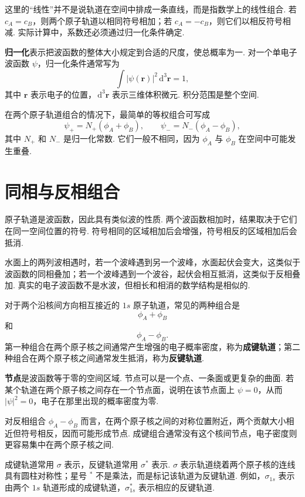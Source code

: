 \documentclass[UTF8,11pt,a4paper,openany]{ctexbook}
\newcommand{\dd}{\,\mathrm d}\newcommand{\Ham}{\hat H}\newcommand{\tr}{\operatorname{Tr}}
\newcommand{\term}[1]{\textbf{#1}}
\begin{document}
这里的“线性”并不是说轨道在空间中排成一条直线，而是指数学上的线性组合. 若 $c_A=c_B$，则两个原子轨道以相同符号相加；若 $c_A=-c_B$，则它们以相反符号相减. 实际计算中，系数还必须通过归一化条件确定. 

\begin{notationbox}
\term{归一化}表示把波函数的整体大小规定到合适的尺度，使总概率为一. 对一个单电子波函数 $\psi$，归一化条件通常写为
\[
\int |\psi(\mathbf r)|^2\dd^3\mathbf r=1,
\]
其中 $\mathbf r$ 表示电子的位置，$\dd^3\mathbf r$ 表示三维体积微元. 积分范围是整个空间. 
\end{notationbox}

在两个原子轨道组合的情况下，最简单的等权组合可写成
\[
\psi_+=N_+(\phi_A+\phi_B),
\qquad
\psi_-=N_-(\phi_A-\phi_B),
\]
其中 $N_+$ 和 $N_-$ 是归一化常数. 它们一般不相同，因为 $\phi_A$ 与 $\phi_B$ 在空间中可能发生重叠. 

\section{同相与反相组合}

原子轨道是波函数，因此具有类似波的性质. 两个波函数相加时，结果取决于它们在同一空间位置的符号. 符号相同的区域相加后会增强，符号相反的区域相加后会抵消. 

\begin{analogybox}
水面上的两列波相遇时，若一个波峰遇到另一个波峰，水面起伏会变大，这类似于波函数的同相叠加；若一个波峰遇到一个波谷，起伏会相互抵消，这类似于反相叠加. 真实的电子波函数不是水波，但相长和相消的数学结构是相似的. 
\end{analogybox}

对于两个沿核间方向相互接近的 $1s$ 原子轨道，常见的两种组合是
\[
\phi_A+\phi_B
\]
和
\[
\phi_A-\phi_B.
\]
第一种组合在两个原子核之间通常产生增强的电子概率密度，称为\term{成键轨道}；第二种组合在两个原子核之间通常发生抵消，称为\term{反键轨道}. 

\begin{definitionbox}
\term{节点}是波函数等于零的空间区域. 节点可以是一个点、一条面或更复杂的曲面. 若某个轨道在两个原子核之间存在一个节点面，说明在该节点面上 $\psi=0$，从而 $|\psi|^2=0$，电子在那里出现的概率密度为零. 
\end{definitionbox}

对反相组合 $\phi_A-\phi_B$ 而言，在两个原子核之间的对称位置附近，两个贡献大小相近但符号相反，因而可能形成节点. 成键组合通常没有这个核间节点，电子密度则更容易集中在两个原子核之间. 

\begin{notationbox}
成键轨道常用 $\sigma$ 表示，反键轨道常用 $\sigma^*$ 表示. $\sigma$ 表示轨道绕着两个原子核的连线具有圆柱对称性；星号 $^*$ 不是乘法，而是标记该轨道为反键轨道. 例如，$\sigma_{1s}$ 表示由两个 $1s$ 轨道形成的成键轨道，$\sigma_{1s}^*$ 表示相应的反键轨道. 
\end{notationbox}
\end{document}
